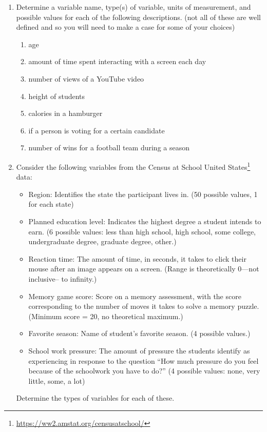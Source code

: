 \documentclass[
]{book}
\providecommand{\tightlist}{%
  \setlength{\itemsep}{0pt}\setlength{\parskip}{0pt}}
\theoremstyle{definition}
\theoremstyle{definition}
\theoremstyle{definition}
\theoremstyle{definition}
\theoremstyle{remark}
\begin{document}
\begin{enumerate}
\def\labelenumi{\arabic{enumi}.}
\item
  Determine a variable name, type(s) of variable, units of measurement, and possible values for each of the following descriptions. (not all of these are well defined and so you will need to make a case for some of your choices)

  \begin{enumerate}
  \def\labelenumii{\alph{enumii}.}
  \tightlist
  \item
    age
  \item
    amount of time spent interacting with a screen each day
  \item
    number of views of a YouTube video
  \item
    height of students
  \item
    calories in a hamburger
  \item
    if a person is voting for a certain candidate
  \item
    number of wins for a football team during a season
  \end{enumerate}
\item
  Consider the following variables from the Census at School United States\footnote{\url{https://ww2.amstat.org/censusatschool/}} data:

  \begin{itemize}
  \tightlist
  \item
    Region: Identifies the state the participant lives in. (50 possible values, 1 for each state)
  \item
    Planned education level: Indicates the highest degree a student intends to earn. (6 possible values: less than high school, high school, some college, undergraduate degree, graduate degree, other.)
  \item
    Reaction time: The amount of time, in seconds, it takes to click their mouse after an image appears on a screen. (Range is theoretically 0---not inclusive-- to infinity.)
  \item
    Memory game score: Score on a memory assessment, with the score corresponding to the number of moves it takes to solve a memory puzzle. (Minimum score = 20, no theoretical maximum.)
  \item
    Favorite season: Name of student's favorite season. (4 possible values.)
  \item
    School work pressure: The amount of pressure the students identify as experiencing in response to the question ``How much pressure do you feel because of the schoolwork you have to do?'' (4 possible values: none, very little, some, a lot)
  \end{itemize}

  Determine the types of variables for each of these.
\end{enumerate}
\end{document}
